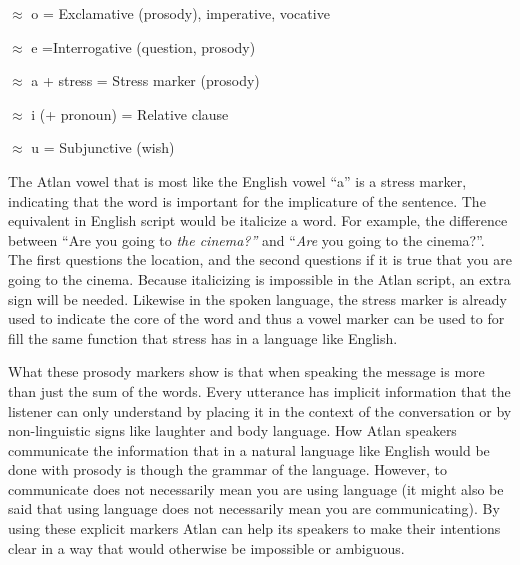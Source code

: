 \begin{itemize}
{\small
\item[\kern-0.4em\Atlano]   $\approx$ o = Exclamative (prosody), imperative, vocative 

\item[\Atlane]  $\approx$ e =Interrogative (question, prosody\footnotemark)    

\item[\Atlana]   $\approx$ a + stress = Stress marker (prosody) 

\item[\kern0.4em\Atlani]   $\approx$ i (+ pronoun) = Relative clause   

\item[\Atlanu]   $\approx$ u  = Subjunctive (wish)
	}
\end{itemize}

\noindent The Atlan vowel that is most like the English vowel “a” is a stress marker, indicating that the word is important for the implicature of the sentence. The equivalent in English script would be italicize a word. For example, the difference between “Are you going to \textit{the cinema?”} and “\textit{Are} you going to the cinema?”. The first questions the location, and the second questions if it is true that you are going to the cinema. Because italicizing is impossible in the Atlan script, an extra sign will be needed. Likewise in the spoken language, the stress marker is already used to indicate the core of the word and thus a vowel marker can be used to for fill the same function that stress has in a language like English.  

What these prosody markers show is that when speaking the message is more than just the sum of the words. Every utterance has implicit information that the listener can only understand by placing it in the context of the conversation or by non-linguistic signs like laughter and body language. How Atlan speakers communicate the information that in a natural language like English would be done with prosody is though the grammar of the language. However, to communicate does not necessarily mean you are using language (it might also be said that using language does not necessarily mean you are communicating). By using these explicit markers Atlan can help its speakers to make their intentions clear in a way that would otherwise be impossible or ambiguous. 

